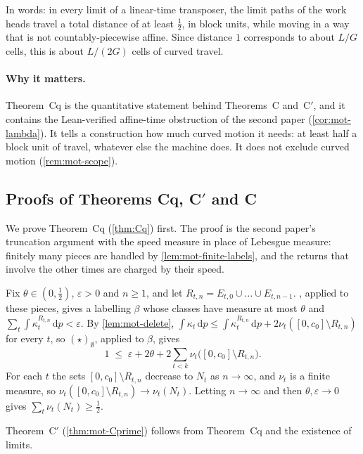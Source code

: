 In words: in every limit of a linear-time transposer, the limit paths of the work heads travel a total distance of at
least $\frac12$, in block units, while moving in a way that is not countably-piecewise affine. Since distance $1$
corresponds to about $L/G$ cells, this is about $L/(2G)$ cells of curved travel.

\paragraph{Why it matters.} Theorem~Cq is the quantitative statement behind Theorems~C and~C$'$, and it contains the
Lean-verified affine-time obstruction of the second paper (\cref{cor:mot-lambda}). It tells a construction how much
curved motion it needs: at least half a block unit of travel, whatever else the machine does. It does not exclude
curved motion (\cref{rem:mot-scope}).

\subsection{Proofs of Theorems Cq, C\texorpdfstring{$'$}{'} and C}\label{sec:mot-proofs}

We prove Theorem~Cq (\cref{thm:Cq}) first. The proof is the second paper's truncation argument with the speed measure in
place of Lebesgue measure: finitely many pieces are handled by \cref{lem:mot-finite-labels}, and the returns that involve
the other times are charged by their speed.

\begin{informalproof}
Fix $\theta\in(0,\frac12)$, $\varepsilon>0$ and $n\ge1$, and let $R_{t,n}=E_{t,0}\cup\dots\cup E_{t,n-1}$.
, applied to these pieces, gives a labelling $\beta$ whose classes have measure at most
$\theta$ and $\sum_t\int\kappa_t^{R_{t,n}}\,\mathrm dp<\varepsilon$. By \cref{lem:mot-delete},
$\int\kappa_t\,\mathrm dp\le\int\kappa_t^{R_{t,n}}\,\mathrm dp+2\nu_t([0,c_0]\setminus R_{t,n})$ for every $t$, so
$(\star)_\emptyset$, applied to $\beta$, gives
\[
  1\;\le\;\varepsilon+2\theta+2\sum_{t<k}\nu_t\bigl([0,c_0]\setminus R_{t,n}\bigr).
\]
For each $t$ the sets $[0,c_0]\setminus R_{t,n}$ decrease to $N_t$ as $n\to\infty$, and $\nu_t$ is a finite measure, so
$\nu_t([0,c_0]\setminus R_{t,n})\to\nu_t(N_t)$. Letting $n\to\infty$ and then $\theta,\varepsilon\to0$ gives
$\sum_t\nu_t(N_t)\ge\frac12$.
\end{informalproof}

Theorem~C$'$ (\cref{thm:mot-Cprime}) follows from Theorem~Cq and the existence of limits.

